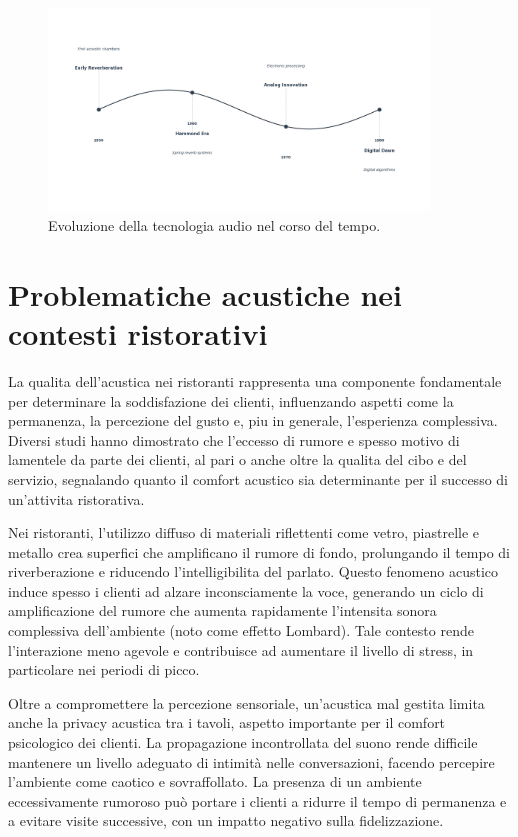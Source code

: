 \begin{figure}[H]
    \centering
    \includegraphics[width=0.9\textwidth]{Chapters/Figures/new_timeline.png}
    \caption{\small Evoluzione della tecnologia audio nel corso del tempo.}
    \label{fig:new_timeline}
\end{figure}


\section{Problematiche acustiche nei contesti ristorativi}
\noindent

La qualita dell'acustica nei ristoranti rappresenta una componente fondamentale per determinare la soddisfazione dei clienti, influenzando aspetti come la permanenza, la percezione del gusto e, piu in generale, l'esperienza complessiva. Diversi studi hanno dimostrato che l'eccesso di rumore e spesso motivo di lamentele da parte dei clienti, al pari o anche oltre la qualita del cibo e del servizio, segnalando quanto il comfort acustico sia determinante per il successo di un'attivita ristorativa. \cite{6031600}

Nei ristoranti, l'utilizzo diffuso di materiali riflettenti come vetro, piastrelle e metallo crea superfici che amplificano il rumore di fondo, prolungando il tempo di riverberazione e riducendo l'intelligibilita del parlato. Questo fenomeno acustico induce spesso i clienti ad alzare inconsciamente la voce, generando un ciclo di amplificazione del rumore che aumenta rapidamente l'intensita sonora complessiva dell'ambiente (noto come effetto Lombard). Tale contesto rende l'interazione meno agevole e contribuisce ad aumentare il livello di stress, in particolare nei periodi di picco. \cite{wilczek2020}

Oltre a compromettere la percezione sensoriale, un'acustica mal gestita limita anche la privacy acustica tra i tavoli, aspetto importante per il comfort psicologico dei clienti. La propagazione incontrollata del suono rende difficile mantenere un livello adeguato di intimità nelle conversazioni, facendo percepire l'ambiente come caotico e sovraffollato. La presenza di un ambiente eccessivamente rumoroso può portare i clienti a ridurre il tempo di permanenza e a evitare visite successive, con un impatto negativo sulla fidelizzazione. \cite{6252340}

